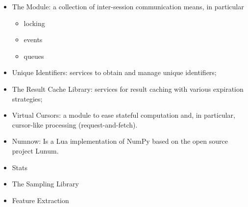 \begin{itemize}
\item The  Module:
      a collection of inter-session
      communication means, in particular
      \begin{itemize} 
      \item locking
      \item events
      \item queues
      \end{itemize} 
\item Unique Identifiers:
      services to obtain and manage unique identifiers;

\item The Result Cache Library:
      services for result caching with various
      expiration strategies;

\item Virtual Cursors:
      a module to ease stateful computation and,
      in particular, cursor-like processing (request-and-fetch).
       
\item Numnow:
      Is a Lua implementation of NumPy
      based on the open source project Lunum.
\item Stats
\item The Sampling Library
\item Feature Extraction
\end{itemize}

